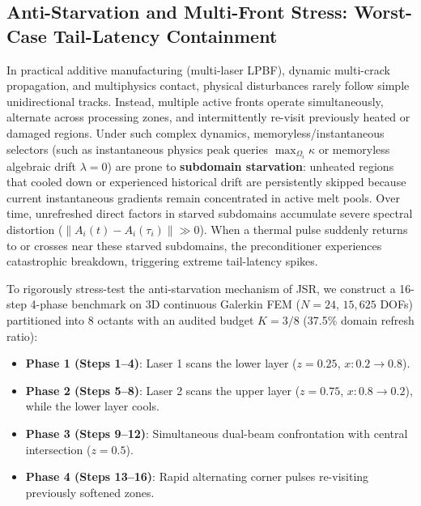 \documentclass[preprint,12pt,3p]{elsarticle}
\begin{document}
\subsection{Anti-Starvation and Multi-Front Stress: Worst-Case Tail-Latency Containment}
\label{subsec:multi_front_starvation}

In practical additive manufacturing (multi-laser LPBF), dynamic multi-crack propagation, and multiphysics contact, physical disturbances rarely follow simple unidirectional tracks. Instead, multiple active fronts operate simultaneously, alternate across processing zones, and intermittently re-visit previously heated or damaged regions. Under such complex dynamics, memoryless/instantaneous selectors (such as instantaneous physics peak queries $\max_{\Omega_i} \kappa$ or memoryless algebraic drift $\lambda=0$) are prone to \textbf{subdomain starvation}: unheated regions that cooled down or experienced historical drift are persistently skipped because current instantaneous gradients remain concentrated in active melt pools. Over time, unrefreshed direct factors in starved subdomains accumulate severe spectral distortion ($\|A_i(t) - A_i(\tau_i)\| \gg 0$). When a thermal pulse suddenly returns to or crosses near these starved subdomains, the preconditioner experiences catastrophic breakdown, triggering extreme tail-latency spikes.

To rigorously stress-test the anti-starvation mechanism of JSR, we construct a 16-step 4-phase benchmark on 3D continuous Galerkin FEM ($N=24$, $15{,}625$ DOFs) partitioned into 8 octants with an audited budget $K=3/8$ (37.5\% domain refresh ratio):
\begin{itemize}
    \item \textbf{Phase 1 (Steps 1--4)}: Laser 1 scans the lower layer ($z=0.25$, $x: 0.2 \to 0.8$).
    \item \textbf{Phase 2 (Steps 5--8)}: Laser 2 scans the upper layer ($z=0.75$, $x: 0.8 \to 0.2$), while the lower layer cools.
    \item \textbf{Phase 3 (Steps 9--12)}: Simultaneous dual-beam confrontation with central intersection ($z=0.5$).
    \item \textbf{Phase 4 (Steps 13--16)}: Rapid alternating corner pulses re-visiting previously softened zones.
\end{itemize}
\end{document}
